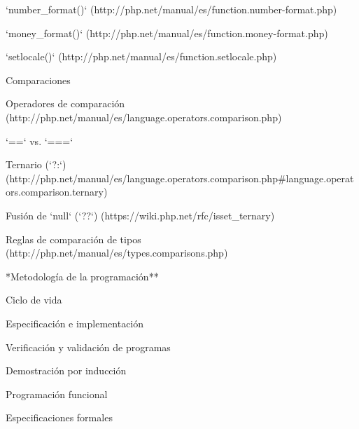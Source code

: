 \begin{longenum}
\begin{longenum}
\begin{longenum}
\begin{longenum}
                \begin{longenum}
                    \item [`number_format()`](http://php.net/manual/es/function.number-format.php)
                    \item [`money_format()`](http://php.net/manual/es/function.money-format.php)
                    \begin{longenum}
                        \item [`setlocale()`](http://php.net/manual/es/function.setlocale.php)
                    \end{longenum}
                \end{longenum}
            \end{longenum}
            \item Comparaciones
            \begin{longenum}
                \item [Operadores de comparación](http://php.net/manual/es/language.operators.comparison.php)
                \item `==` vs. `===`
                \item [Ternario (`?:`)](http://php.net/manual/es/language.operators.comparison.php#language.operators.comparison.ternary)
                \item [Fusión de `null` (`??`)](https://wiki.php.net/rfc/isset_ternary)
                \item [Reglas de comparación de tipos](http://php.net/manual/es/types.comparisons.php)
            \end{longenum}
        \end{longenum}
    \end{longenum}
    \item **Metodología de la programación**
    \begin{longenum}
        \item Ciclo de vida
        \item Especificación e implementación
        \item Verificación y validación de programas
        \begin{longenum}
            \item Demostración por inducción
        \end{longenum}
        \item Programación funcional
        \begin{longenum}
            \item Especificaciones formales

\end{longenum}
\end{longenum}
\end{longenum}
